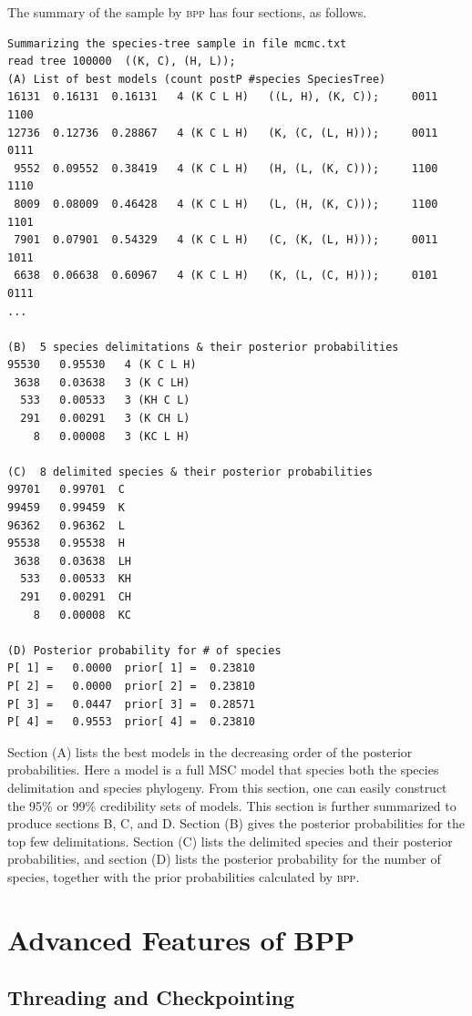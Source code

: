 \documentclass[a4paper]{book}
\numberwithin{equation}{section} \renewcommand{\baselinestretch}{0.55}
\begin{document}
The summary of the sample by \textsc{bpp} has four sections, as
follows.
\begin{verbatim}
Summarizing the species-tree sample in file mcmc.txt
read tree 100000  ((K, C), (H, L));
(A) List of best models (count postP #species SpeciesTree)
16131  0.16131  0.16131   4 (K C L H)   ((L, H), (K, C));     0011 1100
12736  0.12736  0.28867   4 (K C L H)   (K, (C, (L, H)));     0011 0111
 9552  0.09552  0.38419   4 (K C L H)   (H, (L, (K, C)));     1100 1110
 8009  0.08009  0.46428   4 (K C L H)   (L, (H, (K, C)));     1100 1101
 7901  0.07901  0.54329   4 (K C L H)   (C, (K, (L, H)));     0011 1011
 6638  0.06638  0.60967   4 (K C L H)   (K, (L, (C, H)));     0101 0111
...

(B)  5 species delimitations & their posterior probabilities
95530   0.95530   4 (K C L H)
 3638   0.03638   3 (K C LH)
  533   0.00533   3 (KH C L)
  291   0.00291   3 (K CH L)
    8   0.00008   3 (KC L H)

(C)  8 delimited species & their posterior probabilities
99701   0.99701  C
99459   0.99459  K
96362   0.96362  L
95538   0.95538  H
 3638   0.03638  LH
  533   0.00533  KH
  291   0.00291  CH
    8   0.00008  KC

(D) Posterior probability for # of species
P[ 1] =   0.0000  prior[ 1] =  0.23810
P[ 2] =   0.0000  prior[ 2] =  0.23810
P[ 3] =   0.0447  prior[ 3] =  0.28571
P[ 4] =   0.9553  prior[ 4] =  0.23810
\end{verbatim}

Section (A) lists the best models in the decreasing order of the
posterior probabilities.  Here a model is a full MSC model that
species both the species delimitation and species phylogeny.  From
this section, one can easily construct the 95\% or 99\% credibility
sets of models.  This section is further summarized to produce
sections B, C, and D.  Section (B) gives the posterior probabilities
for the top few delimitations.  Section (C) lists the delimited
species and their posterior probabilities, and section (D) lists the
posterior probability for the number of species, together with the
prior probabilities calculated by \textsc{bpp}.


\chapter{Advanced Features of BPP}
\section{Threading and Checkpointing}
\end{document}
